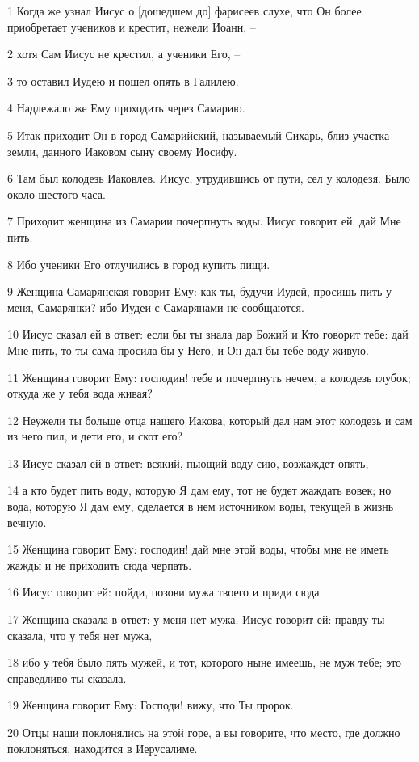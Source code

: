 \par 1 Когда же узнал Иисус о [дошедшем до] фарисеев слухе, что Он более приобретает учеников и крестит, нежели Иоанн, --
\par 2 хотя Сам Иисус не крестил, а ученики Его, --
\par 3 то оставил Иудею и пошел опять в Галилею.
\par 4 Надлежало же Ему проходить через Самарию.
\par 5 Итак приходит Он в город Самарийский, называемый Сихарь, близ участка земли, данного Иаковом сыну своему Иосифу.
\par 6 Там был колодезь Иаковлев. Иисус, утрудившись от пути, сел у колодезя. Было около шестого часа.
\par 7 Приходит женщина из Самарии почерпнуть воды. Иисус говорит ей: дай Мне пить.
\par 8 Ибо ученики Его отлучились в город купить пищи.
\par 9 Женщина Самарянская говорит Ему: как ты, будучи Иудей, просишь пить у меня, Самарянки? ибо Иудеи с Самарянами не сообщаются.
\par 10 Иисус сказал ей в ответ: если бы ты знала дар Божий и Кто говорит тебе: дай Мне пить, то ты сама просила бы у Него, и Он дал бы тебе воду живую.
\par 11 Женщина говорит Ему: господин! тебе и почерпнуть нечем, а колодезь глубок; откуда же у тебя вода живая?
\par 12 Неужели ты больше отца нашего Иакова, который дал нам этот колодезь и сам из него пил, и дети его, и скот его?
\par 13 Иисус сказал ей в ответ: всякий, пьющий воду сию, возжаждет опять,
\par 14 а кто будет пить воду, которую Я дам ему, тот не будет жаждать вовек; но вода, которую Я дам ему, сделается в нем источником воды, текущей в жизнь вечную.
\par 15 Женщина говорит Ему: господин! дай мне этой воды, чтобы мне не иметь жажды и не приходить сюда черпать.
\par 16 Иисус говорит ей: пойди, позови мужа твоего и приди сюда.
\par 17 Женщина сказала в ответ: у меня нет мужа. Иисус говорит ей: правду ты сказала, что у тебя нет мужа,
\par 18 ибо у тебя было пять мужей, и тот, которого ныне имеешь, не муж тебе; это справедливо ты сказала.
\par 19 Женщина говорит Ему: Господи! вижу, что Ты пророк.
\par 20 Отцы наши поклонялись на этой горе, а вы говорите, что место, где должно поклоняться, находится в Иерусалиме.
